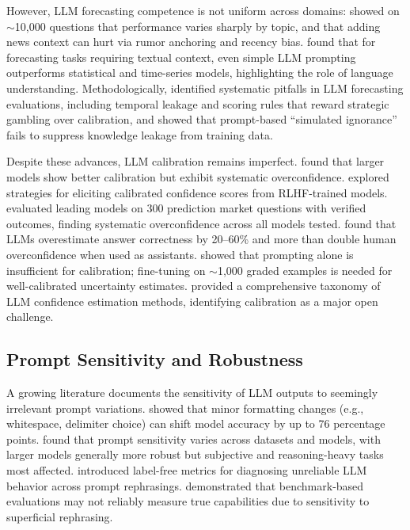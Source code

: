 \documentclass[11pt]{article}
\begin{document}
However, LLM forecasting competence is not uniform across domains: \citet{karkar2025unevenly} showed on ${\sim}$10,000 questions that performance varies sharply by topic, and that adding news context can hurt via rumor anchoring and recency bias. \citet{williams2025contextiskey} found that for forecasting tasks requiring textual context, even simple LLM prompting outperforms statistical and time-series models, highlighting the role of language understanding. Methodologically, \citet{paleka2025pitfalls} identified systematic pitfalls in LLM forecasting evaluations, including temporal leakage and scoring rules that reward strategic gambling over calibration, and \citet{li2026simulated} showed that prompt-based ``simulated ignorance'' fails to suppress knowledge leakage from training data.

Despite these advances, LLM calibration remains imperfect. \citet{kadavath2022language} found that larger models show better calibration but exhibit systematic overconfidence. \citet{tian2023just} explored strategies for eliciting calibrated confidence scores from RLHF-trained models. \citet{kalshi2025bench} evaluated leading models on 300 prediction market questions with verified outcomes, finding systematic overconfidence across all models tested. \citet{sun2025overconfident} found that LLMs overestimate answer correctness by 20--60\% and more than double human overconfidence when used as assistants. \citet{banda2024taught} showed that prompting alone is insufficient for calibration; fine-tuning on ${\sim}$1,000 graded examples is needed for well-calibrated uncertainty estimates. \citet{geng2024survey} provided a comprehensive taxonomy of LLM confidence estimation methods, identifying calibration as a major open challenge.

\subsection{Prompt Sensitivity and Robustness}

A growing literature documents the sensitivity of LLM outputs to seemingly irrelevant prompt variations. \citet{sclar2024quantifying} showed that minor formatting changes (e.g., whitespace, delimiter choice) can shift model accuracy by up to 76 percentage points. \citet{jia2024prosa} found that prompt sensitivity varies across datasets and models, with larger models generally more robust but subjective and reasoning-heavy tasks most affected. \citet{errica2025sensitivity} introduced label-free metrics for diagnosing unreliable LLM behavior across prompt rephrasings. \citet{lunardi2025robustness} demonstrated that benchmark-based evaluations may not reliably measure true capabilities due to sensitivity to superficial rephrasing.
\end{document}
